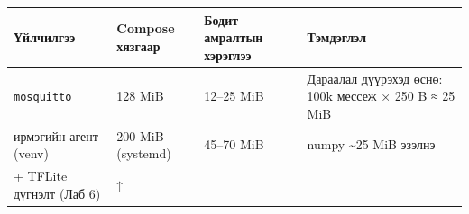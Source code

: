 \begingroup\scriptsize\begin{longtable}[]{@{}llll@{}}
\toprule
\begin{minipage}[b]{0.22\columnwidth}\raggedright
Үйлчилгээ\strut
\end{minipage} & \begin{minipage}[b]{0.22\columnwidth}\raggedright
Compose хязгаар\strut
\end{minipage} & \begin{minipage}[b]{0.22\columnwidth}\raggedright
Бодит амралтын хэрэглээ\strut
\end{minipage} & \begin{minipage}[b]{0.22\columnwidth}\raggedright
Тэмдэглэл\strut
\end{minipage}\tabularnewline
\midrule
\endhead
\begin{minipage}[t]{0.22\columnwidth}\raggedright
\texttt{mosquitto}\strut
\end{minipage} & \begin{minipage}[t]{0.22\columnwidth}\raggedright
128 MiB\strut
\end{minipage} & \begin{minipage}[t]{0.22\columnwidth}\raggedright
12--25 MiB\strut
\end{minipage} & \begin{minipage}[t]{0.22\columnwidth}\raggedright
Дараалал дүүрэхэд өснө: 100k мессеж × 250 B ≈ 25 MiB\strut
\end{minipage}\tabularnewline
\begin{minipage}[t]{0.22\columnwidth}\raggedright
ирмэгийн агент (venv)\strut
\end{minipage} & \begin{minipage}[t]{0.22\columnwidth}\raggedright
200 MiB (systemd)\strut
\end{minipage} & \begin{minipage}[t]{0.22\columnwidth}\raggedright
45--70 MiB\strut
\end{minipage} & \begin{minipage}[t]{0.22\columnwidth}\raggedright
numpy \textasciitilde25 MiB эзэлнэ\strut
\end{minipage}\tabularnewline
\begin{minipage}[t]{0.22\columnwidth}\raggedright
+ TFLite дүгнэлт (Лаб 6)\strut
\end{minipage} & \begin{minipage}[t]{0.22\columnwidth}\raggedright
↑\strut
\end{minipage} & \begin{minipage}[t]{0.22\columnwidth}\raggedright

\end{minipage}
\end{longtable}
